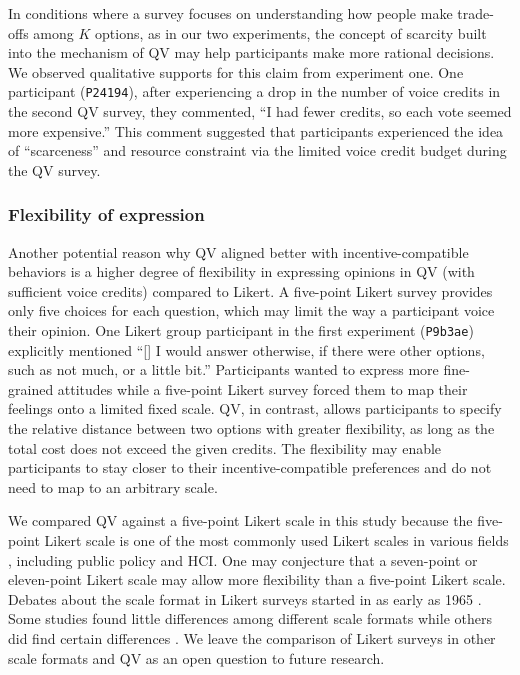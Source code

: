 In conditions where a survey focuses on understanding how people make trade-offs among $K$ options, as in our two experiments, the concept of scarcity built into the mechanism of QV may help participants make more rational decisions. We observed qualitative supports for this claim from experiment one. One participant (\texttt{P24194}), after experiencing a drop in the number of voice credits in the second QV survey, they commented, ``I had fewer credits, so each vote seemed more expensive.'' This comment suggested that participants experienced the idea of ``scarceness'' and resource constraint via the limited voice credit budget during the QV survey.

\subsubsection{Flexibility of expression}
Another potential reason why QV aligned better with incentive-compatible behaviors is a higher degree of flexibility in expressing opinions in QV (with sufficient voice credits) compared to Likert. A five-point Likert survey provides only five choices for each question, which may limit the way a participant voice their opinion. One Likert group participant in the first experiment (\texttt{P9b3ae}) explicitly mentioned ``[\textellipsis] I would answer otherwise, if there were other options, such as not much, or a little bit.'' Participants wanted to express more fine-grained attitudes while a five-point Likert survey forced them to map their feelings onto a limited fixed scale. QV, in contrast, allows participants to specify the relative distance between two options with greater flexibility, as long as the total cost does not exceed the given credits. The flexibility may enable participants to stay closer to their incentive-compatible preferences and do not need to map to an arbitrary scale.

We compared QV against a five-point Likert scale in this study because the five-point Likert scale is one of the most commonly used Likert scales in various fields \cite{malhotra2006basic}, including public policy and HCI. One may conjecture that a seven-point or eleven-point Likert scale may allow more flexibility than a five-point Likert scale. Debates about the scale format in Likert surveys started in as early as 1965 \cite{komorita1965number}. Some studies found little differences among different scale formats while others did find certain differences \cite{dawes2008data}. We leave the comparison of Likert surveys in other scale formats and QV as an open question to future research.

